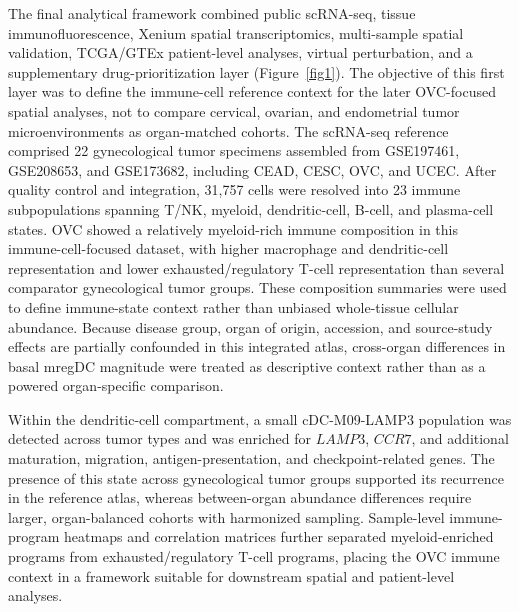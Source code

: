 \documentclass[cancers,article,submit,pdftex,moreauthors]{Definitions/mdpi}
\begin{document}
The final analytical framework combined public scRNA-seq, tissue immunofluorescence, Xenium spatial transcriptomics, multi-sample spatial validation, TCGA/GTEx patient-level analyses, virtual perturbation, and a supplementary drug-prioritization layer (Figure~\ref{fig1}). The objective of this first layer was to define the immune-cell reference context for the later OVC-focused spatial analyses, not to compare cervical, ovarian, and endometrial tumor microenvironments as organ-matched cohorts. The scRNA-seq reference comprised 22 gynecological tumor specimens assembled from GSE197461, GSE208653, and GSE173682, including CEAD, CESC, OVC, and UCEC. After quality control and integration, 31,757 cells were resolved into 23 immune subpopulations spanning T/NK, myeloid, dendritic-cell, B-cell, and plasma-cell states. OVC showed a relatively myeloid-rich immune composition in this immune-cell-focused dataset, with higher macrophage and dendritic-cell representation and lower exhausted/regulatory T-cell representation than several comparator gynecological tumor groups. These composition summaries were used to define immune-state context rather than unbiased whole-tissue cellular abundance. Because disease group, organ of origin, accession, and source-study effects are partially confounded in this integrated atlas, cross-organ differences in basal mregDC magnitude were treated as descriptive context rather than as a powered organ-specific comparison.

Within the dendritic-cell compartment, a small cDC-M09-LAMP3 population was detected across tumor types and was enriched for $LAMP3$, $CCR7$, and additional maturation, migration, antigen-presentation, and checkpoint-related genes. The presence of this state across gynecological tumor groups supported its recurrence in the reference atlas, whereas between-organ abundance differences require larger, organ-balanced cohorts with harmonized sampling. Sample-level immune-program heatmaps and correlation matrices further separated myeloid-enriched programs from exhausted/regulatory T-cell programs, placing the OVC immune context in a framework suitable for downstream spatial and patient-level analyses.
\end{document}
